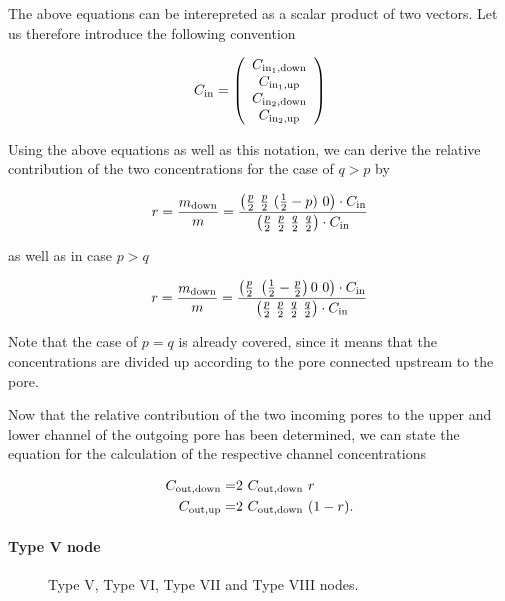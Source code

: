 \documentclass[12pt]{report}
\newcommand*{\PsTricksPath}{pstricks}
\begin{document}
The above equations can be interepreted as a scalar product of two vectors. Let us therefore introduce the following convention

$$
	C_{\rm{in}} = \left( \begin{array}{c} C_{\rm{in_1, down}}\\ C_{\rm{in_1, up}}\\ C_{\rm{in_2, down}}\\ C_{\rm{in_2, up}}\\ \end{array} \right)
$$

Using the above equations as well as this notation, we can derive the relative contribution of the two concentrations for the case of $q > p$ by

$$
	r = \frac{m_{\rm{down}}}{m} = \frac{ \left( \frac{p}{2}\ \frac{p}{2}\ (\frac12 - p)\ 0 \right) \cdot C_{\rm{in}} }{ \left( \frac{p}{2}\ \frac{p}{2}\ \frac{q}{2}\ \frac{q}{2} \right) \cdot C_{\rm{in}} }
$$

as well as in case $p > q$

$$
	r = \frac{m_{\rm{down}}}{m} = \frac{ \left( \frac{p}{2}\ \left(\frac12 - \frac{p}{2} \right) 0\ 0 \right) \cdot C_{\rm{in}} }{ \left( \frac{p}{2}\ \frac{p}{2}\ \frac{q}{2}\ \frac{q}{2} \right) \cdot C_{\rm{in}} }
$$

Note that the case of $p = q$ is already covered, since it means that the concentrations are divided up according to the pore connected upstream to the pore.

Now that the relative contribution of the two incoming pores to the upper and lower channel of the outgoing pore has been determined, we can state the equation for the calculation of the respective channel concentrations

\begin{subequations}
\begin{align}
	C_{\rm{out,down}} = & 2\ C_{\rm{out,down}}\ r \\
	C_{\rm{out,up}}   = & 2\ C_{\rm{out,down}}\ (1 - r).  
\end{align}
\end{subequations}

\paragraph*{Type V node}

\begin{figure}[ht]
	\subfigure
	{} \hfill
	\subfigure
	{}
	\caption{Type V, Type VI, Type VII and Type VIII nodes.}
	\label{fig:node_type_05}
\end{figure}
\end{document}
